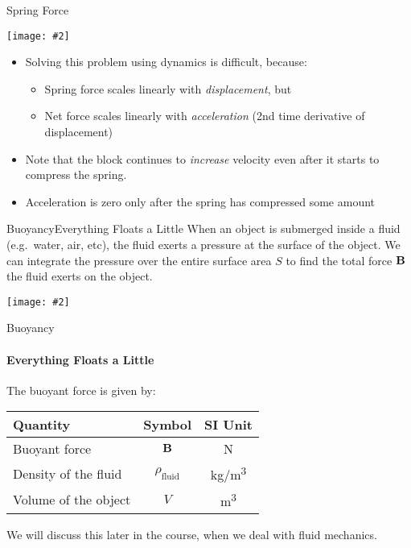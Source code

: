 \documentclass[12pt,compress,aspectratio=169]{beamer}
\newcommand{\pic}[2]{\texttt{[image: \#2]}}
\newcommand{\mb}[1]{\ensuremath\mathbf{#1}}
\newcommand{\eq}[2]{\vspace{#1}{\Large\begin{displaymath}#2\end{displaymath}}}
\begin{document}
\begin{frame}{Spring Force}
  \begin{center}
    \pic{.3}{graphics/spring-example1.png}
  \end{center}
  \begin{itemize}
  \item Solving this problem using dynamics is difficult, because:
    \begin{itemize}
    \item Spring force scales linearly with \emph{displacement}, but
    \item Net force scales linearly with \emph{acceleration} (2nd time
      derivative of displacement)
    \end{itemize}
  \item Note that the block continues to \emph{increase} velocity even after
    it starts to compress the spring.
  \item Acceleration is zero only after the spring has compressed some amount
  \end{itemize}
\end{frame}



\begin{frame}{Buoyancy}{Everything Floats a Little}
  When an object is submerged inside a fluid (e.g.\ water, air, etc), the fluid
  exerts a pressure at the surface of the object. We can integrate the pressure
  over the entire surface area $S$ to find the total force $\mb{B}$ the fluid
  exerts on the object.
  \begin{center}
    \pic{.25}{graphics/rock_fbvectors.jpg}
  \end{center}
\end{frame}



\begin{frame}{Buoyancy}
  \framesubtitle{Everything Floats a Little}
  The buoyant force is given by:
  
  \eq{-.1in}{
    \mb{B}
    =\rho_\mathrm{fluid}g\bm{\hat{k}}\iiint dV
    =\rho_\mathrm{fluid}gV\bm{\hat{k}}
  }
  \begin{center}
    \begin{tabular}{l|c|c}
      \rowcolor{pink}
      \textbf{Quantity} & \textbf{Symbol} & \textbf{SI Unit} \\ \hline
      Buoyant force & $\mb{B}$  & \si{\newton} \\
      Density of the fluid & $\rho_\mathrm{fluid}$ & \si{\kg/\m^3}\\
      Volume of the object & $V$ & \si{\metre^3}
    \end{tabular}
  \end{center}

  We will discuss this later in the course, when we deal with fluid mechanics.
\end{frame}
\end{document}

